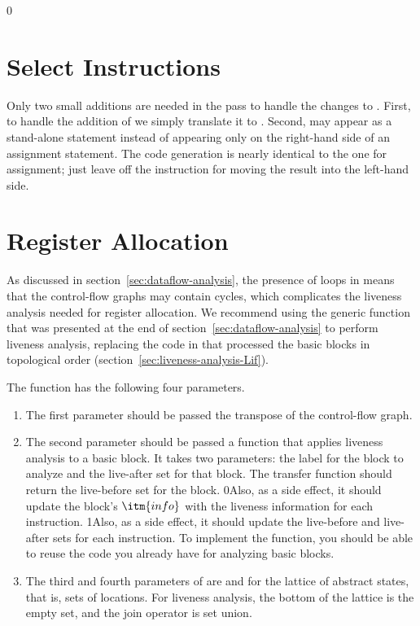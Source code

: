 \documentclass[7x10]{TimesAPriori_MIT}%
\def\racketEd{0}
\def\pythonEd{1}
\def\edition{1}
\newcommand{\racket}[1]{{\if\edition\racketEd{#1}\fi}}
\newcommand{\pythonColor}[0]{}
\newcommand{\python}[1]{{\if\edition\pythonEd\pythonColor #1\fi}}
\numberwithin{theorem}{chapter}
\numberwithin{definition}{chapter}
\numberwithin{equation}{chapter}
\begin{document}
{\if\edition\racketEd
  
\section{Select Instructions}
\label{sec:select-instructions-loop}

Only two small additions are needed in the 
pass to handle the changes to \LangCLoop{}. First, to handle the
addition of \VOID{} we simply translate it to .  Second,
 may appear as a stand-alone statement instead of 
appearing only on the right-hand side of an assignment statement. The code
generation is nearly identical to the one for assignment; just leave
off the instruction for moving the result into the left-hand side.

\fi}

\section{Register Allocation}
\label{sec:register-allocation-loop}

As discussed in section~\ref{sec:dataflow-analysis}, the presence of
loops in \LangLoop{} means that the control-flow graphs may contain cycles,
which complicates the liveness analysis needed for register
allocation.
%
We recommend using the generic  function that
was presented at the end of section~\ref{sec:dataflow-analysis} to
perform liveness analysis, replacing the code in
 that processed the basic blocks in topological
order (section~\ref{sec:liveness-analysis-Lif}).

The  function has the following four parameters.
\begin{enumerate}
\item The first parameter  should be passed the transpose
  of the control-flow graph.
\item The second parameter  should be passed a function
  that applies liveness analysis to a basic block. It takes two
  parameters: the label for the block to analyze and the live-after
  set for that block.  The transfer function should return the
  live-before set for the block.
  \racket{Also, as a side effect, it should update the block's
    $\itm{info}$ with the liveness information for each instruction.}
  \python{Also, as a side effect, it should update the live-before and
    live-after sets for each instruction.}
  To implement the  function, you should be able to
  reuse the code you already have for analyzing basic blocks.
\item The third and fourth parameters of  are
   and  for the lattice of abstract states,
  that is, sets of locations. For liveness analysis, the bottom of the
  lattice is the empty set, and the join operator is set union.
\end{enumerate}
\end{document}
